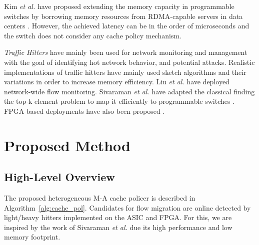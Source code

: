 Kim \textit{et al.} have proposed extending the memory capacity in programmable switches by borrowing memory resources from RDMA-capable servers in data centers \cite{Kim:2018}. However, the achieved latency can be in the order of microseconds and the switch does not consider any cache policy mechanism.


\textit{Traffic Hitters} have mainly been used for network monitoring and management with the goal of identifying hot network behavior, and potential attacks. Realistic implementations of traffic hitters have mainly used sketch algorithms and their variations \cite{Cormode:05,Cormode:08,Metwally:05} in order to increase memory efficiency. Liu \textit{et al. } \cite{Liu:16} have deployed network-wide flow monitoring. Sivaraman \textit{et al. } \cite{Sivaraman:17} have adapted the classical finding the top-k element problem \cite{Metwally:05} to map it efficiently to programmable switches \cite{Bosshart:13}. FPGA-based deployments have also been proposed \cite{Tong:13,Tong:16,Zazo:17}.

\section{Proposed Method}\label{sec:method}

\subsection{High-Level Overview}\label{sec:method:overview}

The proposed heterogeneous M-A cache policer is described in Algorithm~\ref{alg:cache_pol}. Candidates for flow migration are online detected by light/heavy hitters implemented on the ASIC and FPGA. For this, we are inspired by the work of Sivaraman \textit{et al.} \cite{Sivaraman:17} due its high performance and low memory footprint.

